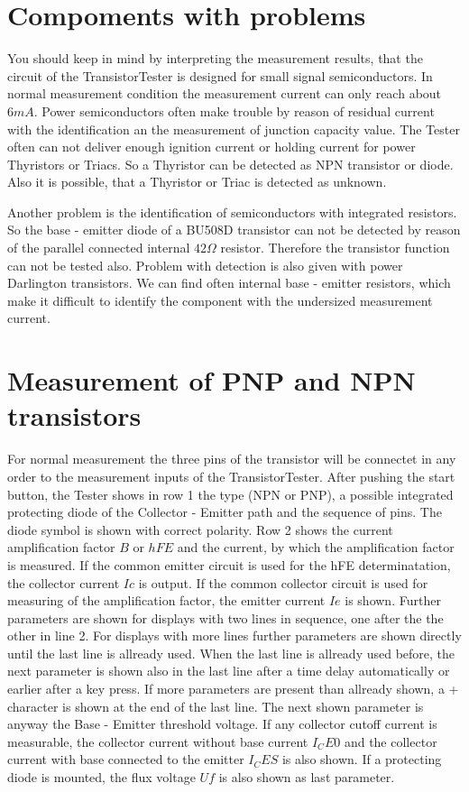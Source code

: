 \section{Compoments with problems}
You should keep in mind by interpreting the measurement results, that the circuit of the TransistorTester is
designed for small signal semiconductors. In normal measurement condition the measurement current can only reach about \(6mA\).
Power semiconductors often make trouble by reason of residual current with the identification an the measurement of junction capacity value.
The Tester often can not deliver enough ignition current or holding current for power Thyristors or Triacs.
So a Thyristor can be detected as NPN transistor or diode. Also it is possible, that a Thyristor or Triac is detected as unknown.

Another problem is the identification of semiconductors with integrated resistors.
So the base - emitter diode of a BU508D transistor can not be detected by reason of the parallel connected
internal \(42\Omega\) resistor.
Therefore the transistor function can not be tested also.
Problem with detection is also given with power Darlington transistors. We can find often internal
base - emitter resistors, which make it difficult to identify the component with the undersized measurement current.

\section{Measurement of PNP and NPN transistors}
For normal measurement the three pins of the transistor will be connectet in any order to the measurement
inputs of the TransistorTester.
After pushing the start button, the Tester shows in row 1 the type (NPN or PNP), 
a possible integrated protecting diode of the Collector - Emitter path and the
sequence of pins. The diode symbol is shown with correct polarity.
Row 2 shows the current amplification factor \(B\) or \(hFE\) and the current, by which the
amplification factor is measured. If the common emitter circuit is used for the hFE determinatation,
the collector current \(Ic\) is output. If the common collector circuit is used for measuring of the
amplification factor, the emitter current \(Ie\) is shown.
Further parameters are shown for displays with two lines in sequence, one after the the other in line 2.
For displays with more lines further parameters are shown directly until the last line is allready used.
When the last line is allready used before, the next parameter is shown also in the last line
after a time delay automatically or earlier after a key press.
If more parameters are present than allready shown, a + character is shown at the end of the last line.
The next shown parameter is anyway the Base - Emitter threshold voltage.
If any collector cutoff current is measurable, the collector current without base current \(I_CE0\)
and the collector current with base connected to the emitter \(I_CES\) is also shown.
If a protecting diode is mounted, the flux voltage \(Uf\) is also shown as last parameter.


